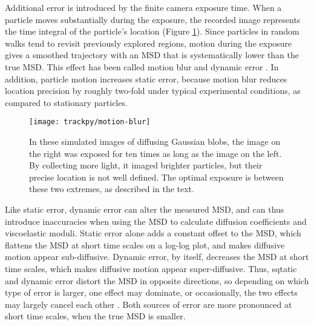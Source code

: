 Additional error is introduced by the finite  camera exposure time. When a particle moves substantially during the exposure, the recorded image represents the time integral of the particle's location (Figure \ref{fig:motion-blur}). Since particles in random walks tend to revisit previously explored regions, motion during the exposure gives a smoothed trajectory with an MSD that is systematically lower than the true MSD\cite{Crocker2007,Berg1971a}. This effect has been called motion blur and dynamic error \cite{Savin2005}. In addition, particle motion increases static error, because motion blur reduces location precision by roughly two-fold under typical experimental conditions, as compared to stationary particles\cite{Deschout2012}.

   \begin{figure}
    \centering
    \texttt{[image: trackpy/motion-blur]}
    \caption{\label{fig:motion-blur}In these simulated images of diffusing Gaussian blobs, the image on the right was exposed for ten times as long as the image on the left. By collecting more light, it imaged brighter particles, but their precise location is not well defined. The optimal exposure is between these two extremes, as described in the text.}
    \end{figure}

Like static error, dynamic error can alter the measured MSD, and can thus introduce inaccuracies when using the MSD to calculate diffusion coefficients and viscoelastic moduli. Static error alone adds a constant offset to the MSD, which flattens the MSD at short time scales on a log-log plot, and makes diffusive motion appear sub-diffusive\cite{Martin2002a}. Dynamic error, by itself, decreases the MSD at short time scales, which makes diffusive motion appear super-diffusive. Thus, sqtatic and dynamic error distort the MSD in opposite directions, so depending on which type of error is larger, one effect may dominate, or occasionally, the two effects may largely cancel each other \cite{Savin2005}. Both sources of error are more pronounced at short time scales, when the true MSD is smaller.

